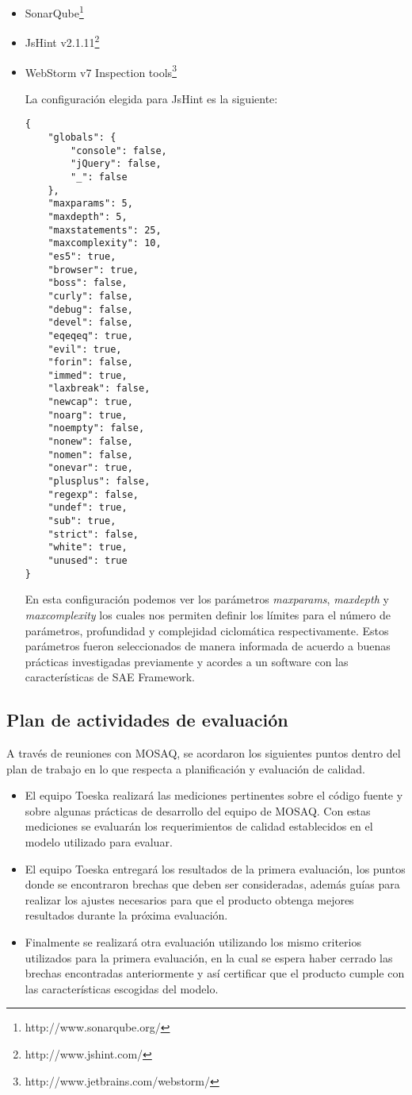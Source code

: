 \begin{itemize}
\item SonarQube\footnote{http://www.sonarqube.org/}
\item JsHint v2.1.11\footnote{http://www.jshint.com/}
\item WebStorm v7 Inspection tools\footnote{http://www.jetbrains.com/webstorm/}


La configuración elegida para JsHint es la siguiente:
\begin{verbatim}
{
    "globals": {
        "console": false,
        "jQuery": false,
        "_": false
    },
    "maxparams": 5,
    "maxdepth": 5,
    "maxstatements": 25,
    "maxcomplexity": 10,
    "es5": true,
    "browser": true,
    "boss": false,
    "curly": false,
    "debug": false,
    "devel": false,
    "eqeqeq": true,
    "evil": true,
    "forin": false,
    "immed": true,
    "laxbreak": false,
    "newcap": true,
    "noarg": true,
    "noempty": false,
    "nonew": false,
    "nomen": false,
    "onevar": true,
    "plusplus": false,
    "regexp": false,
    "undef": true,
    "sub": true,
    "strict": false,
    "white": true,
    "unused": true
}
\end{verbatim}

En esta configuración podemos ver los parámetros \textit{maxparams}, \textit{maxdepth} 
y \textit{maxcomplexity} los cuales nos permiten definir los límites para el número de parámetros, 
profundidad y complejidad ciclomática respectivamente. Estos parámetros fueron seleccionados de manera 
informada de acuerdo a buenas prácticas investigadas previamente y acordes a un software con las 
características de SAE Framework.
\end{itemize}

\subsection{Plan de actividades de evaluación}

A través de reuniones con MOSAQ, se acordaron los siguientes puntos dentro del plan de trabajo en lo 
que respecta a planificación y evaluación de calidad.
\begin{itemize}
\item El equipo Toeska realizará las mediciones pertinentes sobre el código fuente y sobre algunas 
prácticas de desarrollo del equipo de MOSAQ. Con estas mediciones se evaluarán los requerimientos de 
calidad establecidos en el modelo utilizado para evaluar.

\item El equipo Toeska entregará los resultados de la primera evaluación, los puntos donde se encontraron 
brechas que deben ser consideradas, además guías para realizar los ajustes necesarios para que el producto 
obtenga mejores resultados durante la próxima evaluación.

\item Finalmente se realizará otra evaluación utilizando los mismo criterios utilizados 
para la primera evaluación, en la cual se espera haber cerrado las brechas encontradas anteriormente 
y así certificar que el producto cumple con las características escogidas del modelo.
\end{itemize}


